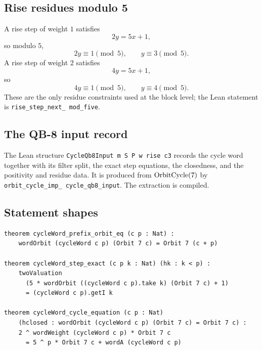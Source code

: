 \subsection{Rise residues modulo 5}

A rise step of weight $1$ satisfies
\begin{equation*}
  2y=5x+1,
\end{equation*}
so modulo $5$,
\begin{equation*}
  2y\equiv1\pmod5,
  \qquad
  y\equiv3\pmod5.
\end{equation*}
A rise step of weight $2$ satisfies
\begin{equation*}
  4y=5x+1,
\end{equation*}
so
\begin{equation*}
  4y\equiv1\pmod5,
  \qquad
  y\equiv4\pmod5.
\end{equation*}
These are the only residue constraints used at the block level; the
Lean statement is
\texttt{rise\_\allowbreak step\_\allowbreak next\_\allowbreak
mod\_\allowbreak five}.

\subsection{The QB-8 input record}

The Lean structure \texttt{CycleQb8Input m S P w rise c3} records the
cycle word together with its filter split, the exact step equations,
the closedness, and the positivity and residue data.  It is produced
from $\mathrm{OrbitCycle}(7)$ by
\texttt{orbit\_\allowbreak cycle\_\allowbreak imp\_\allowbreak
cycle\_\allowbreak qb8\_\allowbreak input}.  The extraction is
compiled.

\subsection{Statement shapes}

\begin{verbatim}
theorem cycleWord_prefix_orbit_eq (c p : Nat) :
    wordOrbit (cycleWord c p) (Orbit 7 c) = Orbit 7 (c + p)

theorem cycleWord_step_exact (c p k : Nat) (hk : k < p) :
    twoValuation
      (5 * wordOrbit ((cycleWord c p).take k) (Orbit 7 c) + 1)
      = (cycleWord c p).getI k

theorem cycleWord_cycle_equation (c p : Nat)
    (hclosed : wordOrbit (cycleWord c p) (Orbit 7 c) = Orbit 7 c) :
    2 ^ wordWeight (cycleWord c p) * Orbit 7 c
      = 5 ^ p * Orbit 7 c + wordA (cycleWord c p)
\end{verbatim}

